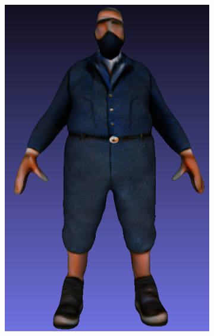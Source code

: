 \begin{figure}[ht]
\begin{subfigure}[b]{0.1721\textwidth}
        \includegraphics[width=\textwidth]{etc/bias/bias_poor_genie_2.png}
        \caption{}
    \end{subfigure}
    \begin{subfigure}[b]{0.172\textwidth}
        \centering

\end{subfigure}
\end{figure}
